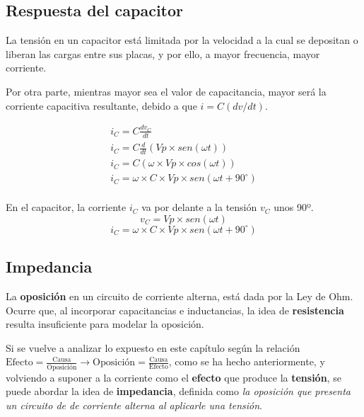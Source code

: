 \subsection{Respuesta del capacitor}

La tensión en un capacitor está limitada por la velocidad a la cual se depositan o liberan las cargas entre sus placas, y por ello, a mayor frecuencia, mayor corriente.

Por otra parte, mientras mayor sea el valor de capacitancia, mayor será la corriente capacitiva resultante, debido a que $i = C(dv/dt)$.

\begin{eqnarray*}
	i_C = C \frac{dv_C}{dt} \\
	i_C = C \frac{d}{dt}(Vp\times sen(\omega t)) \\
	i_C = C (\omega \times Vp \times cos(\omega t)) \\
	i_C = \omega \times C \times Vp \times sen(\omega t + 90^{\circ}) \\
\end{eqnarray*}

\begin{conclusiones}
	En el capacitor, la corriente $i_C$ va por delante a la tensión $v_C$ unos 90º. 
	\begin{equation}
		\label{eq:v_capacitor}
		v_C = Vp\times sen(\omega t)
	\end{equation}
	\begin{equation}
		\label{eq:i_capacitor}
		i_C = \omega \times C \times Vp \times sen(\omega t + 90^{\circ})
	\end{equation}
\end{conclusiones}



\subsection{Impedancia}

La \textbf{oposición} en un circuito de corriente alterna, está dada por la Ley de Ohm. Ocurre que, al incorporar capacitancias e inductancias, la idea de \textbf{resistencia} resulta insuficiente para modelar la oposición.

Si se vuelve a analizar lo expuesto en este capítulo según la relación $\text{Efecto} = \frac{\text{Causa}}{\text{Oposición}} \rightarrow \text{Oposición} = \frac{\text{Causa}}{\text{Efecto}}$, como se ha hecho anteriormente, y volviendo a suponer a la corriente como el \textbf{efecto} que produce la \textbf{tensión}, se puede abordar la idea de \textbf{impedancia}, definida como \textit{la oposición que presenta un circuito de de corriente alterna al aplicarle una tensión}.

